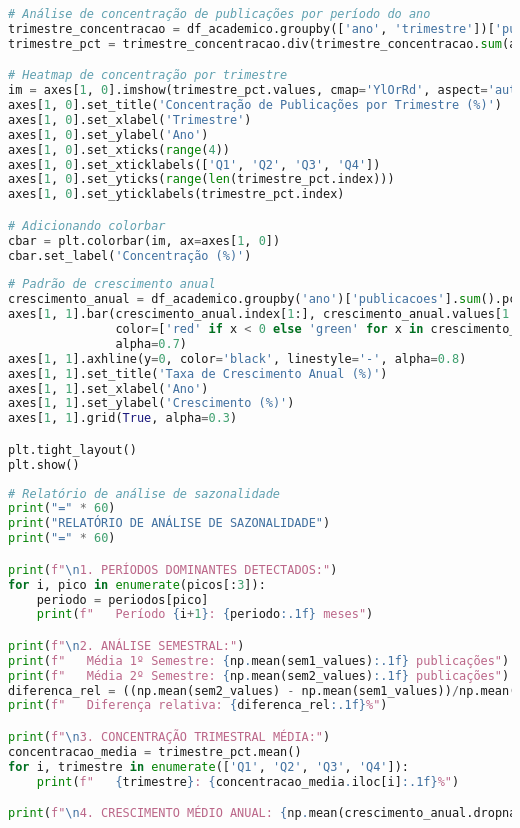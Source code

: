 \begin{pythonbox}
\begin{lstlisting}[language=Python]
# Análise de concentração de publicações por período do ano
trimestre_concentracao = df_academico.groupby(['ano', 'trimestre'])['publicacoes'].sum().unstack()
trimestre_pct = trimestre_concentracao.div(trimestre_concentracao.sum(axis=1), axis=0) * 100

# Heatmap de concentração por trimestre
im = axes[1, 0].imshow(trimestre_pct.values, cmap='YlOrRd', aspect='auto')
axes[1, 0].set_title('Concentração de Publicações por Trimestre (%)')
axes[1, 0].set_xlabel('Trimestre')
axes[1, 0].set_ylabel('Ano')
axes[1, 0].set_xticks(range(4))
axes[1, 0].set_xticklabels(['Q1', 'Q2', 'Q3', 'Q4'])
axes[1, 0].set_yticks(range(len(trimestre_pct.index)))
axes[1, 0].set_yticklabels(trimestre_pct.index)

# Adicionando colorbar
cbar = plt.colorbar(im, ax=axes[1, 0])
cbar.set_label('Concentração (%)')
\end{lstlisting}
\end{pythonbox}

\begin{pythonbox}
\begin{lstlisting}[language=Python]
# Padrão de crescimento anual
crescimento_anual = df_academico.groupby('ano')['publicacoes'].sum().pct_change() * 100
axes[1, 1].bar(crescimento_anual.index[1:], crescimento_anual.values[1:], 
               color=['red' if x < 0 else 'green' for x in crescimento_anual.values[1:]], 
               alpha=0.7)
axes[1, 1].axhline(y=0, color='black', linestyle='-', alpha=0.8)
axes[1, 1].set_title('Taxa de Crescimento Anual (%)')
axes[1, 1].set_xlabel('Ano')
axes[1, 1].set_ylabel('Crescimento (%)')
axes[1, 1].grid(True, alpha=0.3)

plt.tight_layout()
plt.show()
\end{lstlisting}
\end{pythonbox}

\begin{pythonbox}
\begin{lstlisting}[language=Python]
# Relatório de análise de sazonalidade
print("=" * 60)
print("RELATÓRIO DE ANÁLISE DE SAZONALIDADE")
print("=" * 60)

print(f"\n1. PERÍODOS DOMINANTES DETECTADOS:")
for i, pico in enumerate(picos[:3]):
    periodo = periodos[pico]
    print(f"   Período {i+1}: {periodo:.1f} meses")

print(f"\n2. ANÁLISE SEMESTRAL:")
print(f"   Média 1º Semestre: {np.mean(sem1_values):.1f} publicações")
print(f"   Média 2º Semestre: {np.mean(sem2_values):.1f} publicações")
diferenca_rel = ((np.mean(sem2_values) - np.mean(sem1_values))/np.mean(sem1_values)*100)
print(f"   Diferença relativa: {diferenca_rel:.1f}%")

print(f"\n3. CONCENTRAÇÃO TRIMESTRAL MÉDIA:")
concentracao_media = trimestre_pct.mean()
for i, trimestre in enumerate(['Q1', 'Q2', 'Q3', 'Q4']):
    print(f"   {trimestre}: {concentracao_media.iloc[i]:.1f}%")

print(f"\n4. CRESCIMENTO MÉDIO ANUAL: {np.mean(crescimento_anual.dropna()):.1f}%")
\end{lstlisting}
\end{pythonbox}

